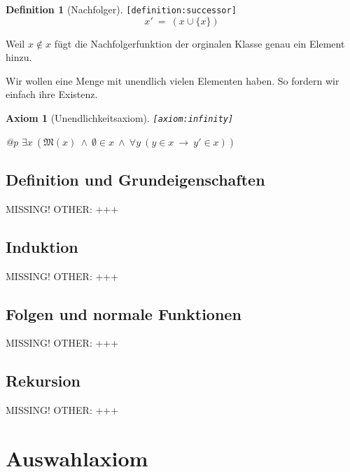 \documentclass[a4paper,german,10pt,twoside]{book}
\newtheorem{ax}{Axiom}
\theoremstyle{definition}
\newtheorem{defn}{Definition}
\theoremstyle{remark}
\begin{document}
\begin{defn}[Nachfolger]
\label{definition:successor} \hypertarget{definition:successor}{}
{\tt \tiny [\verb]definition:successor]]}
$$x' \ = \ (x \cup \{ x \})$$
\end{defn}

Weil $x \notin x$ f{\"u}gt die Nachfolgerfunktion der orginalen Klasse
genau ein Element hinzu.


\par
Wir wollen eine Menge mit unendlich vielen Elementen haben. So fordern wir einfach ihre Existenz.

\begin{ax}[Unendlichkeitsaxiom]
\label{axiom:infinity} \hypertarget{axiom:infinity}{}
{\tt \tiny [\verb]axiom:infinity]]}
\mbox{}
\begin{longtable}{{@{\extracolsep{\fill}}p{\linewidth}}}
\centering $\exists x\ (\mathfrak{M}(x)\ \land\ \emptyset \in x\ \land\ \forall y\ (y \in x\ \rightarrow\ y' \in x))$
\end{longtable}

\end{ax}


\section{Definition und Grundeigenschaften} \label{chapter6_section2} \hypertarget{chapter6_section2}{}
MISSING! OTHER: +++

\section{Induktion} \label{chapter6_section3} \hypertarget{chapter6_section3}{}
MISSING! OTHER: +++

\section{Folgen und normale Funktionen} \label{chapter6_section4} \hypertarget{chapter6_section4}{}
MISSING! OTHER: +++

\section{Rekursion} \label{chapter6_section5} \hypertarget{chapter6_section5}{}
MISSING! OTHER: +++



\chapter{Auswahlaxiom} \label{chapter7} \hypertarget{chapter7}{}
\end{document}
